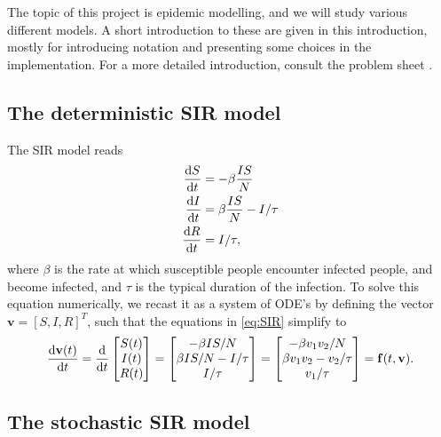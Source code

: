 The topic of this project is epidemic modelling, and we will study various different models. A short introduction to these are given in this introduction, mostly for introducing notation and presenting some choices in the implementation. For a more detailed introduction, consult the problem sheet \cite{sheet}.

\subsection{The deterministic SIR model}
The SIR model reads 
\begin{subequations}\label{eq:SIR}
\begin{align}
	\frac{\text{d} S}{\text{d} t} &= - \beta \frac{I S}{N}\\
	\frac{\text{d} I}{\text{d} t} &= \beta \frac{IS }{N} - I/\tau \\
	\frac{\text{d} R}{\text{d} t} &= I/\tau, 
\end{align}
\end{subequations}
where $\beta$ is the rate at which susceptible people encounter infected people, and become infected, and $\tau$ is the typical duration of the infection. To solve this equation numerically, we recast it as a system of ODE's by defining the vector $\mathbf{v} = [S,I,R]^T$, such that the equations in \ref{eq:SIR} simplify to
\begin{equation}\label{eq:sir_vect}
	\frac{\text{d} \mathbf{v}(t)}{\text{d} t} = \frac{\mathrm{d}}{\mathrm{d}t} \begin{bmatrix}
		S(t) \\
		I(t) \\
		R(t)
	\end{bmatrix}
	= \begin{bmatrix}
		- \beta IS/N \\
		\beta  IS/N - I/\tau \\
		I/\tau
	\end{bmatrix} = \begin{bmatrix}
		-\beta v_1 v_2 /N \\
		\beta v_1 v_2 - v_2/\tau \\
		v_1 / \tau
	\end{bmatrix}= \mathbf{f}(t,\mathbf{v}).
\end{equation}

\subsection{The stochastic SIR model}

